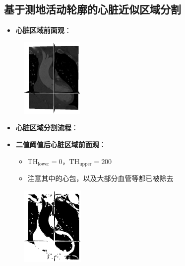 \subsection[心脏分割]{基于测地活动轮廓的心脏近似区域分割}

\begin{frame}
\begin{itemize}
  \item \textbf{心脏区域前面观}：
\end{itemize}
\begin{figure}[t]
\centering
\includegraphics[height=1.5in]{../../Figures/gac/heart/original.eps}
\end{figure}
\end{frame}

\begin{frame}
\begin{itemize}
  \item \textbf{心脏区域分割流程}：
\end{itemize}
\begin{figure}[t]
\centering

\end{figure}
\end{frame}

\begin{frame}
\begin{itemize}
  \item \textbf{二值阈值后心脏区域前面观}：
  \begin{itemize}
    \item $\text{TH}_{\text{lower}} = 0$，$\text{TH}_{\text{upper}} = 200$
    \item 注意其中的心包，以及大部分血管等都已被除去
  \end{itemize}
\end{itemize}
\begin{figure}[t]
\centering
\includegraphics[height=1.5in]{../../Figures/gac/heart/binary_threshold.eps}
\end{figure}
\end{frame}

